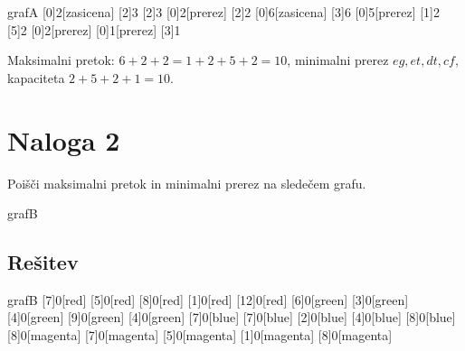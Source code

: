 \documentclass[14pt]{extarticle}
\begin{document}
\begin{pretok}{grafA}
    \nicle
    [0]{2}[zasicena]
    [2]{3}
    [2]{3}
    [0]{2}[prerez]
    [2]{2}
    [0]{6}[zasicena]
    [3]{6}
    [0]{5}[prerez]
    [1]{2}
    [5]{2}
    [0]{2}[prerez]
    [0]{1}[prerez]
    [3]{1}


\end{pretok}

Maksimalni pretok: $6+2+2 = 1+2+5+2 = 10$,
minimalni prerez $eg, et, dt, cf$, kapaciteta $2+5+2+1 = 10$.

\clearpage

\section*{Naloga 2}

Poišči maksimalni pretok in minimalni prerez na sledečem grafu.

\begin{pretok}{grafB}
\end{pretok}

\subsection*{Rešitev}

\begin{pretok}{grafB}
    \nicle
    [7]{0}[red]
    [5]{0}[red]
    [8]{0}[red]
    [1]{0}[red]
    [12]{0}[red]
    [6]{0}[green]
    [3]{0}[green]
    [4]{0}[green]
    [9]{0}[green]
    [4]{0}[green]
    [7]{0}[blue]
    [7]{0}[blue]
    [2]{0}[blue]
    [4]{0}[blue]
    [8]{0}[blue]
    [8]{0}[magenta]
    [7]{0}[magenta]
    [5]{0}[magenta]
    [1]{0}[magenta]
    [8]{0}[magenta]
\end{pretok}
\end{document}
